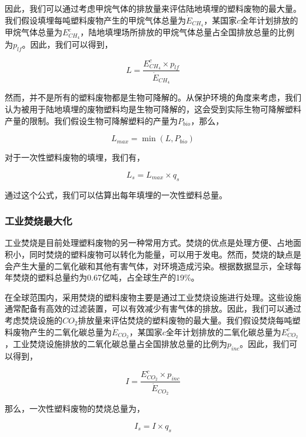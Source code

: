 \documentclass[UTF8, fontset=windows]{mcmthesis}
\begin{document}
因此，我们可以通过考虑甲烷气体的排放量来评估陆地填埋的塑料废物的最大量。我们假设填埋每吨塑料废物产生的甲烷气体总量为$\dot{E}_{CH_4}$，某国家$c$全年计划排放的甲烷气体总量为${E}^{c}_{CH_4}$，陆地填埋场所排放的甲烷气体总量占全国排放总量的比例为$p_{lf}$。因此，我们可以得到，

\begin{equation}
L = \frac{{E}^{c}_{CH_4} \times p_{lf}}{\dot{E}_{CH_4}}
\end{equation}


然而，并不是所有的塑料废物都是生物可降解的。从保护环境的角度来考虑，我们认为被用于陆地填埋的废物塑料均是生物可降解的，这会受到实际生物可降解塑料产量的限制。我们假设生物可降解塑料的产量为$P_{bio}$，那么，

\begin{equation}
L_{max} = \min(L, P_{bio})
\end{equation}

对于一次性塑料废物的填埋，我们有，

\begin{equation}
L_s = L_{max} \times q_s
\end{equation}

通过这个公式，我们可以估算出每年填埋的一次性塑料总量。

\subsubsection{工业焚烧最大化}

工业焚烧是目前处理塑料废物的另一种常用方式。焚烧的优点是处理方便、占地面积小，同时焚烧的塑料废物可以转化为能量，可以用于发电。然而，焚烧的缺点是会产生大量的二氧化碳和其他有害气体，对环境造成污染。根据数据显示\cite{annexcompose}，全球每年焚烧的塑料总量约为0.67亿吨，占全球生产的19\%。

在全球范围内，采用焚烧的塑料废物主要是通过工业焚烧设施进行处理。这些设施通常配备有高效的过滤装置，可以有效减少有害气体的排放。因此，我们可以通过考虑焚烧设施的$CO_2$排放量来评估焚烧的塑料废物的最大量。我们假设焚烧每吨塑料废物产生的二氧化碳总量为$\dot{E}_{CO_2}$，某国家$c$全年计划排放的二氧化碳总量为${E}^{c}_{CO_2}$，工业焚烧设施排放的二氧化碳总量占全国排放总量的比例为$p_{inc}$。因此，我们可以得到，

\begin{equation}
I = \frac{{E}^{c}_{CO_2} \times p_{inc}}{\dot{E}_{CO_2}}
\end{equation}

那么，一次性塑料废物的焚烧总量为，

\begin{equation}
I_s = I \times q_s
\end{equation}
\end{document}
